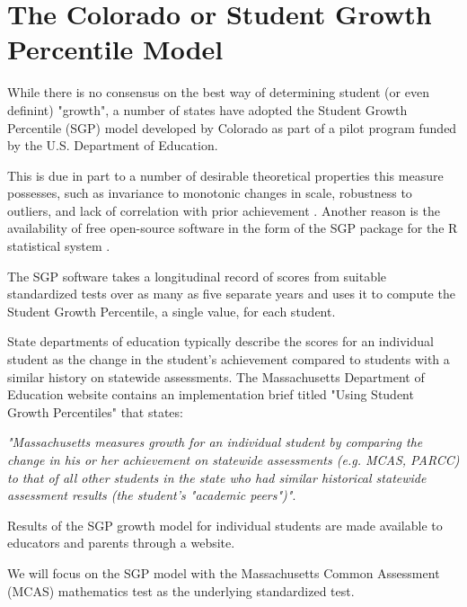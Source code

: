 \documentclass[reqno,12pt]{amsart}
\theoremstyle{plain}
\numberwithin{equation}{section} %
\numberwithin{figure}{section} %
\theoremstyle{remark}
\begin{document}
\section{The Colorado or Student Growth Percentile Model}
While there is no consensus on the best way of determining student (or even definint) "growth", a number of states have adopted the Student Growth Percentile (SGP) model developed by Colorado as part of a pilot program funded by the U.S. Department of Education.  
\par\vspace{0.3 cm}
This is due in part to a number of desirable theoretical properties this measure possesses, such as invariance to monotonic changes in scale, robustness to outliers, and lack of correlation with prior achievement \cite{bb3}.  Another reason is the availability of free open-source software in the form of the SGP package for the R statistical system \cite{bb2}.   
\par\vspace{0.3 cm}
The SGP software takes a longitudinal record of scores from suitable standardized tests over as many as five separate years and uses it to compute the Student Growth Percentile, a single value, for each student. 
\par\vspace{0.3 cm}
State departments of education typically describe the scores for an individual student as the change in the student's achievement compared to students with a similar history on statewide assessments.  The Massachusetts Department of Education website contains an implementation brief titled "Using Student Growth Percentiles" \cite{mdoe1} that states:
\par\vspace{0.3 cm}
\textit{"Massachusetts measures growth for an individual student by comparing the change in his or her achievement on statewide assessments (e.g. MCAS, PARCC) to that of all other students in the state who had
similar historical statewide assessment results (the student's "academic peers")"}.
\par\vspace{0.3 cm}
Results of the SGP growth model for individual students are made available to educators and parents through a website.
\par\vspace{0.3 cm}
We will focus on the SGP model with the Massachusetts Common Assessment (MCAS) mathematics test as the underlying standardized test. 
\vspace{0.4cm}
\end{document}
